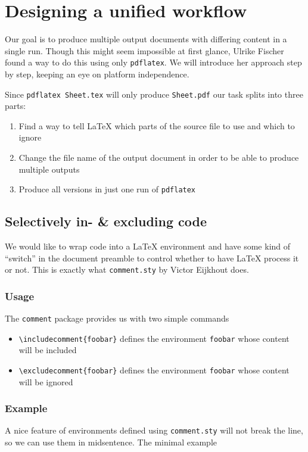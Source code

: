 \documentclass{maps}
\begin{document}
\section{Designing a unified workflow}

Our goal is to produce multiple output documents with differing content in a single run. Though this might seem impossible at first glance, Ulrike Fischer 
found a way \cite{arn:fischer} to do this using only \texttt{pdflatex}. We will introduce her approach step by step, keeping an eye on platform independence.

Since \texttt{pdflatex Sheet.tex} will only produce \texttt{Sheet.pdf} our task splits into three parts:
\begin{enumerate}
\item Find a way to tell \LaTeX{} which parts of the source file to use and which to ignore
\item Change the file name of the output document in order to be able to produce multiple outputs
\item Produce all versions in just one run of \texttt{pdflatex}
\end{enumerate}

\subsection{Selectively in- \& excluding code}

We would like to wrap code into a \LaTeX{} environment and have
some kind of \enquote{switch} in the document preamble to control
whether to have \LaTeX{} process it or not. This is exactly what \texttt{comment.sty} by Victor Eijkhout \cite{arn:eijkhout} does.

\subsubsection{Usage}

The \texttt{comment} package provides us with two simple commands

\begin{itemize}
\item \verb+\includecomment{foobar}+ \quad
defines the environment \texttt{foobar} whose content will be included
\item \verb+\excludecomment{foobar}+ \quad
defines the environment \texttt{foobar} whose content will be ignored
\end{itemize}

\subsubsection{Example}
A nice feature of environments defined using \texttt{comment.sty}
will not break the line, so we can use them in midsentence.
The minimal example
\end{document}
